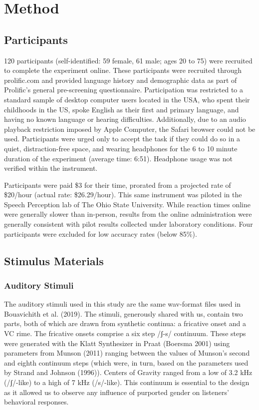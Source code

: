 \documentclass[
  letterpaper,
  DIV=11,
  numbers=noendperiod]{scrartcl}
\begin{document}
\section{Method}\label{sec-method}

\subsection{Participants}\label{sec-participants}

120 participants (self-identified: 59 female, 61 male; ages 20 to 75)
were recruited to complete the experiment online. These participants
were recruited through prolific.com and provided language history and
demographic data as part of Prolific's general pre-screening
questionnaire. Participation was restricted to a standard sample of
desktop computer users located in the USA, who spent their childhoods in
the US, spoke English as their first and primary language, and having no
known language or hearing difficulties. Additionally, due to an audio
playback restriction imposed by Apple Computer, the Safari browser could
not be used. Participants were urged only to accept the task if they
could do so in a quiet, distraction-free space, and wearing headphones
for the 6 to 10 minute duration of the experiment (average time: 6:51).
Headphone usage was not verified within the instrument.

Participants were paid \$3 for their time, prorated from a projected
rate of \$20/hour (actual rate: \$26.29/hour). This same instrument was
piloted in the Speech Perception lab of The Ohio State University. While
reaction times online were generally slower than in-person, results from
the online administration were generally consistent with pilot results
collected under laboratory conditions. Four participants were excluded
for low accuracy rates (below 85\%).

\subsection{Stimulus Materials}\label{sec-stimuli}

\subsubsection{Auditory Stimuli}\label{sec-stimuli-auditory}

The auditory stimuli used in this study are the same wav-format files
used in Bouavichith et al. (2019). The stimuli, generously shared with
us, contain two parts, both of which are drawn from synthetic continua:
a fricative onset and a VC rime. The fricative onsets comprise a six
step /ʃ-s/ continuum. These steps were generated with the Klatt
Synthesizer in Praat (Boersma 2001) using parameters from Munson (2011)
ranging between the values of Munson's second and eighth continuum steps
(which were, in turn, based on the parameters used by Strand and Johnson
(1996)). Centers of Gravity ranged from a low of 3.2 kHz (/ʃ/-like) to a
high of 7 kHz (/s/-like). This continuum is essential to the design as
it allowed us to observe any influence of purported gender on listeners'
behavioral responses.
\end{document}

